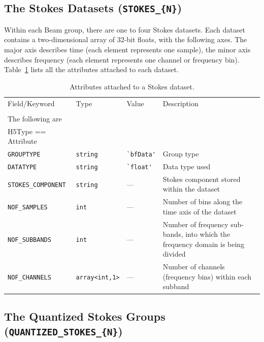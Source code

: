 \documentclass[a4paper,10pt,bibtotoc]{scrartcl}
\begin{document}
\subsection{The Stokes Datasets ({\tt STOKES\_\{N\}})}
\label{sec:Stokes Datasets}

Within each Beam group, there are one to four Stokes datasets. Each dataset contains a two-dimensional array of 32-bit floats, with the following axes. The major axis describes time (each element represents one sample), the minor axis describes frequency (each element represents one channel or frequency bin). Table~\ref{tab:stokes attributes} lists all the attributes attached to each dataset.

\begin{table}[htbp]
  \centering
  \begin{tabular}{|lllp{5.5cm}|}
    \hline
    \sc Field/Keyword  & \sc Type & \sc Value & Description \\
    \sc   & \sc & \sc & \\
    \hline \hline
    \sc The following are & \sc & \sc & \\
    \sc H5Type == Attribute & \sc & \sc & \\
    \hline 
    \verb|GROUPTYPE|    & \verb|string|  & \verb|`bfData'| & Group type \\
    \verb|DATATYPE |    & \verb|string|  & \verb|`float'| & Data type used \\
    \verb|STOKES_COMPONENT|  & \verb|string| & --- & Stokes component stored within the dataset \\
    \verb|NOF_SAMPLES|  & \verb|int| & --- & Number of bins along the time axis of the dataset \\
    \verb|NOF_SUBBANDS|  & \verb|int| & --- & Number of frequency sub-bands, into which the frequency domain is being divided \\
    \verb|NOF_CHANNELS|  & \verb|array<int,1>| & --- & Number of channels (frequency bins) within each subband \\
    \hline 
  \end{tabular}
  \caption{Attributes attached to a Stokes dataset.}
  \label{tab:stokes attributes}
\end{table}


\clearpage
\subsection{The Quantized Stokes Groups ({\tt QUANTIZED\_STOKES\_\{N\}})}
\label{sec:QuantizedStokes}
\end{document}

